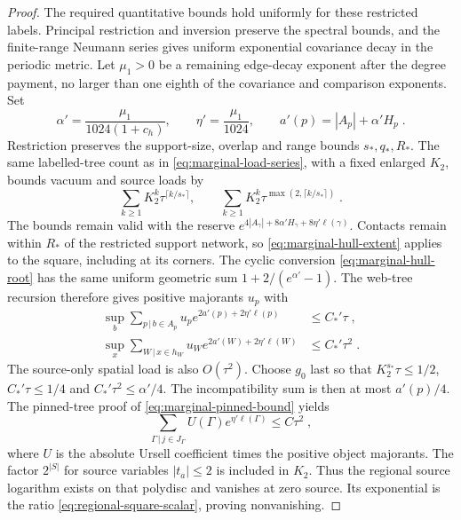\documentclass[11pt]{article}
\begin{document}
\begin{proof}
The required quantitative bounds hold uniformly for these restricted labels. Principal restriction and inversion preserve the spectral bounds, and the finite-range Neumann series gives uniform exponential covariance decay in the periodic metric. Let $\mu_1>0$ be a remaining edge-decay exponent after the degree payment, no larger than one eighth of the covariance and comparison exponents. Set
\begin{equation}
    \alpha'=\frac{\mu_1}{1024(1+c_h)},
    \qquad \eta'=\frac{\mu_1}{1024},
    \qquad a'(p)=|A_p|+\alpha'H_p\;.
\end{equation}
Restriction preserves the support-size, overlap and range bounds $s_*,q_*,R_*$. The same labelled-tree count as in \eqref{eq:marginal-load-series}, with a fixed enlarged $K_2$, bounds vacuum and source loads by
\begin{equation}
    \sum_{k\geq1}K_2^k\tau^{\lceil k/s_*\rceil},
    \qquad
    \sum_{k\geq1}K_2^k\tau^{\max(2,\lceil k/s_*\rceil)}\;.
\end{equation}
The bounds remain valid with the reserve $e^{4|A_\gamma|+8\alpha'H_\gamma+8\eta'\ell(\gamma)}$. Contacts remain within $R_*$ of the restricted support network, so \eqref{eq:marginal-hull-extent} applies to the square, including at its corners. The cyclic conversion \eqref{eq:marginal-hull-root} has the same uniform geometric sum $1+2/(e^{\alpha'}-1)$. The web-tree recursion therefore gives positive majorants $u_p$ with
\begin{equation}
    \begin{aligned}
        \sup_b\sum_{p\, | \,b\in A_p}u_pe^{2a'(p)+2\eta'\ell(p)}&\leq C_*'\tau\;,\\
        \sup_x\sum_{W\, | \,x\in h_W}u_We^{2a'(W)+2\eta'\ell(W)}&\leq C_*'\tau^2\;.
    \end{aligned}
\end{equation}
The source-only spatial load is also $O(\tau^2)$. Choose $g_0$ last so that $K_2^{s_*}\tau\leq1/2$, $C_*'\tau\leq1/4$ and $C_*'\tau^2\leq\alpha'/4$. The incompatibility sum is then at most $a'(p)/4$. The pinned-tree proof of \eqref{eq:marginal-pinned-bound} yields
\begin{equation}\label{eq:regional-square-rooted-majorant}
    \sum_{\Gamma\, | \,j\in J_\Gamma}U(\Gamma)e^{\eta'\ell(\Gamma)}\leq C\tau^2\;,
\end{equation}
where $U$ is the absolute Ursell coefficient times the positive object majorants. The factor $2^{|S|}$ for source variables $|t_a|\leq2$ is included in $K_2$. Thus the regional source logarithm exists on that polydisc and vanishes at zero source. Its exponential is the ratio \eqref{eq:regional-square-scalar}, proving nonvanishing.


\end{proof}
\end{document}

